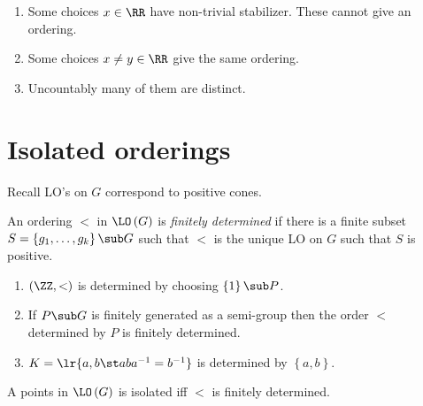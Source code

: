 \begin{fact}
\begin{enumerate}
\item Some choices $x\in \RR$ have non-trivial stabilizer. These cannot give an ordering. 
\item Some choices $x\neq y\in \RR$ give the same ordering.
\item Uncountably many of them are distinct.
\end{enumerate}
\end{fact}

\section{Isolated orderings}

Recall LO's on $G$ correspond to positive cones. 

\begin{defn}
An ordering $<$ in $\LO\left(G\right)$ is \emph{finitely determined} if there is a finite
subset $S = \left\{g_1 , \ldots , g_k\right\}\sub G$ such that $<$ is the unique LO on $G$
such that $S$ is positive.
\end{defn}

\begin{exm}
\begin{enumerate}
\item $\left(\ZZ , <\right)$ is determined by choosing $\left\{1\right\}\sub P$.
\item If $P\sub G$ is finitely generated as a semi-group then the order $<$ determined by 
$P$ is finitely determined.
\item $K = \lr{a,b \st aba^{-1} = b^{-1}}$ is determined by $\left\{a,b\right\}$.
\end{enumerate}
\end{exm}

\begin{prop}
A points in $\LO\left(G\right)$ is isolated iff $<$ is finitely determined.
\end{prop}


